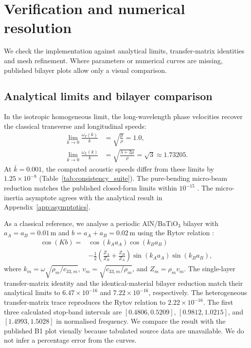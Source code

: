 \section{Verification and numerical resolution}
\label{sec:verification}

We check the implementation against analytical limits, transfer-matrix identities and mesh refinement. Where parameters or numerical curves are missing, published bilayer plots allow only a visual comparison.

\subsection{Analytical limits and bilayer comparison}
In the isotropic homogeneous limit, the long-wavelength phase velocities recover the classical transverse and longitudinal speeds:
\begin{equation}
\begin{split}
\lim_{k\to0}\frac{\omega_T(k)}{k}&=\sqrt{\frac{\mu}{\rho}}=1.0,\\
\lim_{k\to0}\frac{\omega_L(k)}{k}&=\sqrt{\frac{\lambda+2\mu}{\rho}}=\sqrt{3}\approx1.73205.
\end{split}
\label{eq:acoustic_limits}
\end{equation}
At $\bar{k}=0.001$, the computed acoustic speeds differ from these limits by $1.25\times10^{-8}$ (Table~\ref{tab:consistency_suite}). The pure-bending micro-beam reduction matches the published closed-form limits within $10^{-15}$ \cite{papargyribeskou2009}. The micro-inertia asymptote agrees with the analytical result in Appendix~\ref{app:asymptotics}.

As a classical reference, we analyse a periodic AlN/BaTiO$_3$ bilayer with $a_A=a_B=0.01\,\mathrm{m}$ and $b=a_A+a_B=0.02\,\mathrm{m}$ using the Rytov relation \cite{li2024anchorB,zhengwei2009}:
\begin{equation}
\begin{split}
\cos(Kb)={}&\cos(k_Aa_A)\cos(k_Ba_B) \\
&-\frac{1}{2}\left(\frac{Z_A}{Z_B}+\frac{Z_B}{Z_A}\right)\sin(k_Aa_A)\sin(k_Ba_B),
\end{split}
\label{eq:rytov}
\end{equation}
where $k_m=\omega\sqrt{\rho_m/c_{33,m}}$, $v_m=\sqrt{c_{33,m}/\rho_m}$, and $Z_m=\rho_m v_m$. The single-layer transfer-matrix identity and the identical-material bilayer reduction match their analytical limits to $6.47\times10^{-16}$ and $7.22\times10^{-16}$, respectively. The heterogeneous transfer-matrix trace reproduces the Rytov relation to $2.22\times10^{-16}$. The first three calculated stop-band intervals are $[0.4806,0.5209]$, $[0.9812,1.0215]$, and $[1.4993,1.5028]$ in normalised frequency. We compare the result with the published B1 plot visually because tabulated source data are unavailable. We do not infer a percentage error from the curves.

